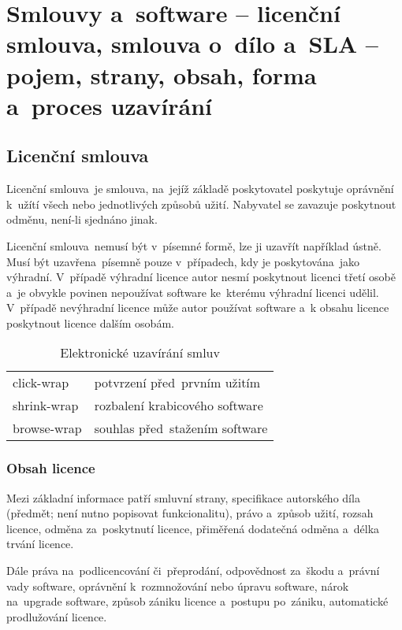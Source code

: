 
\clearpage
\section{Smlouvy a~software -- licenční smlouva, smlouva o~dílo a~SLA -- pojem, strany, obsah, forma a~proces uzavírání}

\subsection{Licenční smlouva}

Licenční smlouva~je smlouva, na~jejíž základě poskytovatel poskytuje oprávnění k~užítí všech nebo jednotlivých způsobů užití. Nabyvatel se zavazuje poskytnout odměnu, není-li sjednáno jinak.

Licenční smlouva~nemusí být v~písemné formě, lze ji uzavřít například ústně. Musí být uzavřena~písemně pouze v~případech, kdy je poskytována~jako výhradní. V~případě výhradní licence autor nesmí poskytnout licenci třetí osobě a~je obvykle povinen nepoužívat software ke~kterému výhradní licenci udělil. V~případě nevýhradní licence může autor používat software a~k obsahu licence poskytnout licence dalším osobám.

\begin{table}[ht]
	\centering
	\caption{Elektronické uzavírání smluv}
	\begin{tabular}{l|l}
	click-wrap  & potvrzení před~prvním užitím \\
	shrink-wrap & rozbalení krabicového software \\
	browse-wrap & souhlas před~stažením software \\
	\end{tabular}
\end{table}

\subsubsection{Obsah licence}

Mezi základní informace patří smluvní strany, specifikace autorského díla (předmět; není nutno popisovat funkcionalitu), právo a~způsob užití, rozsah licence, odměna za~poskytnutí licence, přiměřená dodatečná odměna a~délka trvání licence.

Dále práva na~podlicencování či~přeprodání, odpovědnost za~škodu a~právní vady software, oprávnění k~rozmnožování nebo úpravu software, nárok na~upgrade software, způsob zániku licence a~postupu po~zániku, automatické prodlužování licence.

